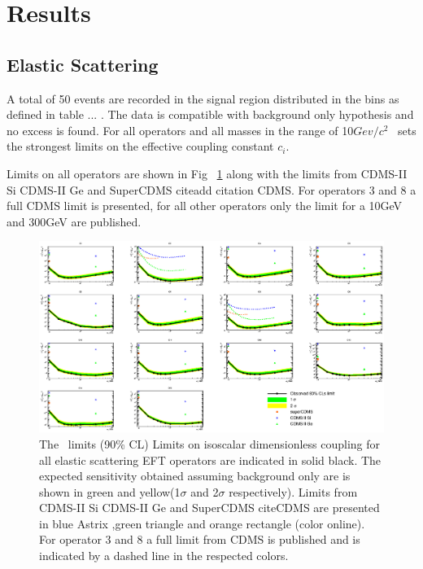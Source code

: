 \section{Results}
\subsection{Elastic Scattering}
A total of 50 events are recorded in the signal region distributed in the bins as defined in table ... . The data is compatible with background only hypothesis and no excess is found. For all operators and all masses in the range of 10$Gev/c^2$ \Xehund\ sets the strongest limits on the effective coupling constant $c_i$. 

Limits on all operators are shown in Fig ~\ref{fig:elasticLimit} along with the limits from CDMS-II Si CDMS-II Ge and SuperCDMS cite{add citation CDMS}. For operators 3 and 8 a full CDMS limit is presented, for all other operators only the limit for a 10GeV and 300GeV are published. 

\begin{figure}
\begin{minipage}{1.\linewidth}
\centerline{\includegraphics[width=1.\linewidth]{Figures/ElasticAllLimitCDMS.eps}}
\end{minipage}
\caption{The \Xehund\ limits (90\% CL) Limits on isoscalar dimensionless coupling for all elastic scattering EFT operators are indicated in solid black. The expected sensitivity obtained assuming background only are is shown in green and yellow(1$\sigma$ and 2$\sigma$ respectively). Limits from CDMS-II Si CDMS-II Ge and SuperCDMS cite{CDMS} are presented in blue Astrix ,green triangle and orange rectangle (color online). For operator 3 and 8 a full limit from CDMS is published and is indicated by a dashed line in the respected colors.}
\label{fig:elasticLimit}
\end{figure}



